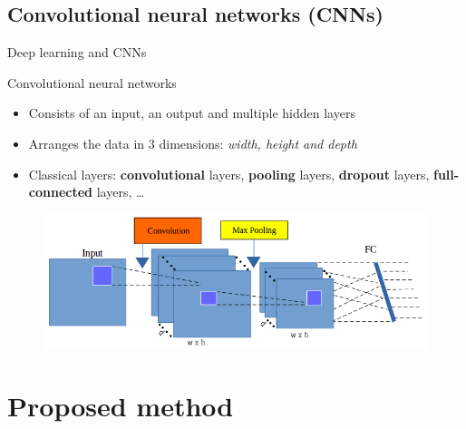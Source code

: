 \documentclass[10pt,svgnames]{beamer}
\begin{document}
\subsection{Convolutional neural networks (CNNs)}
\begin{frame}{Deep learning and CNNs}
	\begin{block}{Convolutional neural networks}
	\begin{itemize}
		\item Consists of an input, an output and multiple hidden layers\footnotemark[1]
		\item Arranges the data in $3$ dimensions: \textit{width, height and depth}
		\item Classical layers: \textbf{\color{conv}convolutional} layers, \textbf{\color{pool}pooling} layers, \textbf{\color{drop}dropout} layers, \textbf{\color{blue}full-connected} layers, \ldots
	\end{itemize}
		\end{block}
	\begin{figure}[htbp]
  		\centering
   	 	\includegraphics[scale=.27]{images/arch_cnn1}
	\end{figure}
\end{frame}
\section{Proposed method}
\end{document}
